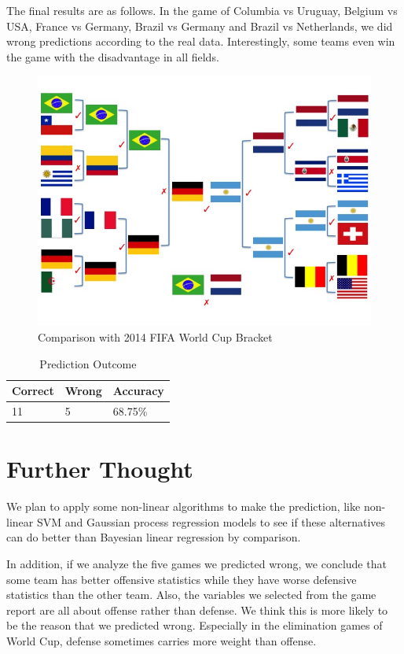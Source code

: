 \documentclass{article}
\begin{document}
The final results are as follows. In the game of Columbia vs Uruguay, Belgium vs USA, France vs Germany, Brazil vs Germany and Brazil vs Netherlands, we did wrong predictions according to the real data. Interestingly, some teams even win the game with the disadvantage in all fields.

\begin{figure}[H]
\centering
\includegraphics[width=0.9\linewidth]{Slide3.jpg}
\caption{Comparison with 2014 FIFA World Cup Bracket}
\label{fig:pred}
\end{figure}



\begin{table}[H]
\centering
\vspace{2ex}
\begin{tabular}{l l l}
\toprule
\textbf{Correct} & \textbf{Wrong} & \textbf{Accuracy}\\
\midrule
11 & 5 & 68.75\% \\
\bottomrule
\end{tabular}
\caption{Prediction Outcome}
\end{table}

\section{Further Thought}

We plan to apply some non-linear algorithms to make the prediction, like non-linear SVM and Gaussian process regression models to see if these alternatives can do better than Bayesian linear regression by comparison. 

In addition, if we analyze the five games we predicted wrong, we conclude that some team has better offensive statistics while they have worse defensive statistics than the other team. Also, the variables we selected from the game report are all about offense rather than defense. We think this is more likely to be the reason that we predicted wrong. Especially in the elimination games of World Cup, defense sometimes carries more weight than offense. 
\end{document}

